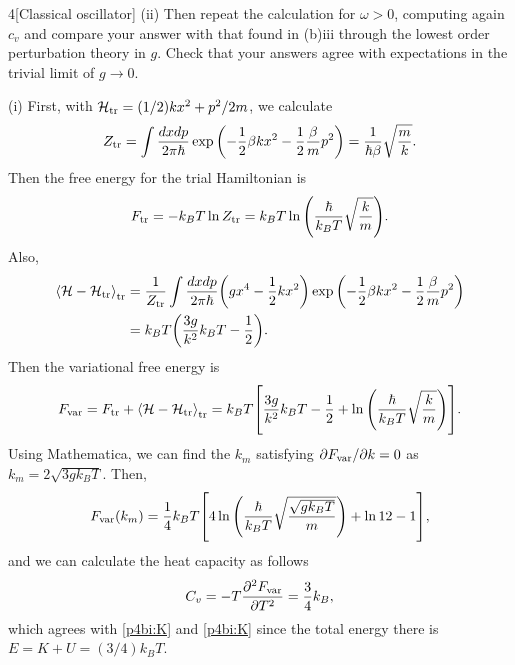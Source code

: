 \documentclass[12pt]{article}
\begin{document}
\begin{problem}{4}[Classical oscillator]
\qquad(ii) Then repeat the calculation for $\omega>0$, computing again $c_v$ and
compare your answer with that found in (b)iii through the lowest order
perturbation theory in $g$. Check that your answers agree with expectations in
the trivial limit of $g\to0$. 
\begin{solution}
(i) First, with $\mathcal{H}_{\text{tr}}=(1/2)kx^2+p^2/2m$, we calculate
\begin{align}
    Z_{\text{tr}}
    =\int\frac{dxdp}{2\pi\hbar}\exp\qty(-\frac12\beta
    kx^2-\frac12\frac\beta{m}p^2)
    =\frac1{\hbar\beta}\sqrt{\frac{m}{k}}.
\end{align}
Then the free energy for the trial Hamiltonian is
\begin{equation}
    F_{\text{tr}}
    =-k_BT\ln Z_{\text{tr}}
    =k_BT\ln\qty(\frac{\hbar}{k_BT}\sqrt{\frac{k}{m}}).
\end{equation}
Also,
\begin{align}\label{p4ci:dHH}
    \expval{\mathcal{H}-\mathcal{H}_{\text{tr}}}_{\text{tr}}
    &=\frac1{Z_{\text{tr}}}\int\frac{dxdp}{2\pi\hbar}\qty(gx^4-\frac12kx^2)\exp\qty(-\frac12\beta
    k x^2-\frac12\frac\beta{m}p^2)\notag\\
    &=k_BT\qty(\frac{3g}{k^2}k_BT-\frac12).
\end{align}
Then the variational free energy is
\begin{equation}
    F_{\text{var}}=F_{\text{tr}}+\expval{\mathcal{H}-\mathcal{H}_{\text{tr}}}_{\text{tr}}
    =k_BT\qty[\frac{3g}{k^2}k_BT-\frac12+\ln\qty(\frac{\hbar}{k_BT}\sqrt{\frac{k}{m}})].
\end{equation}
Using Mathematica, we can find the $k_m$ satisfying $\partial F_{\text{var}}/\partial
k=0$ as $k_m=2\sqrt{3gk_BT}$. Then,
\begin{equation}
    F_{\text{var}}(k_m)=\frac14k_BT\qty[4\ln\qty(\frac{\hbar}{k_BT}\sqrt{\frac{\sqrt{gk_BT}}{m}})+\ln12-1],
\end{equation}
and we can calculate the heat capacity as follows
\begin{equation}
    C_v=-T\frac{\partial^2F_{\text{var}}}{\partial T^2}=\frac34k_B, 
\end{equation}
which agrees with \eqref{p4bi:K} and \eqref{p4bi:K} since the total energy there
is $E=K+U=(3/4)k_BT$.


\end{solution}
\end{problem}
\end{document}
